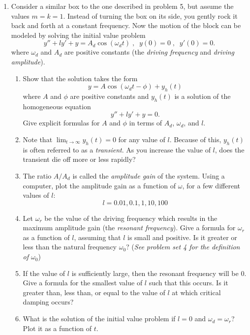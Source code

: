 \documentclass[10pt,psamsfonts,reqno,oneside,letterpaper]{amsart}
\begin{document}
\begin{enumerate}[I]
\begin{enumerate}
\end{enumerate}
\item  Consider a similar box to the one described in problem 5, but assume the values $m = k = 1$.  Instead of turning the box on its side, you gently rock it back and forth at a constant frequency.  Now the motion of the block can be modeled by solving the initial value problem 
\[ y'' + ly' + y = A_d \cos(\omega_d t) \; , \; \; y(0) = 0 \; , \; \; y'(0) = 0. \]
where $\omega_d$ and $A_d$ are positive constants (the \emph{driving frequency} and \emph{driving amplitude}).
\begin{enumerate}
	\item  Show that the solution takes the form
	\[ y = A \cos(\omega_d t - \phi) + y_h(t) \]
	where $A$ and $\phi$ are positive constants and $y_h(t)$ is a solution of the homogeneous equation
	\[ y'' + ly' + y = 0. \]
	Give explicit formulas for $A$ and $\phi$ in terms of $A_d$, $\omega_d$, and $l$.
	\item Note that $\displaystyle \lim_{t \to \infty} y_h(t) = 0$ for any value of $l$.  Because of this, $y_h(t)$ is often referred to as a \emph{transient}.  As you increase the value of $l$, does the transient die off more or less rapidly?
	\item  The ratio $A/A_d$ is called the \emph{amplitude gain} of the system.  Using a computer, plot the amplitude gain as a function of $\omega$, for a few different values of $l$:
	\[ l = 0.01, 0.1, 1, 10, 100 \]
	\item  Let $\omega_r$ be the value of the driving frequency which results in the maximum amplitude gain (the \emph{resonant frequency}). Give a formula for $\omega_r$ as a function of $l$, assuming that $l$ is small and positive.  Is it greater or less than the natural frequency $\omega_0$?  (\textit{See problem set 4 for the definition of $\omega_0$})
	\item  If the value of $l$ is sufficiently large, then the resonant frequency will be $0$.  Give a formula for the smallest value of $l$ such that this occurs.   Is it greater than, less than, or equal to the value of $l$ at which critical damping occurs?
	\item   What is the solution of the initial value problem if $l = 0$ and $\omega_d = \omega_r$? Plot it as a function of $t$. 
\end{enumerate}
	\end{enumerate}
	
	
	
\end{document}
